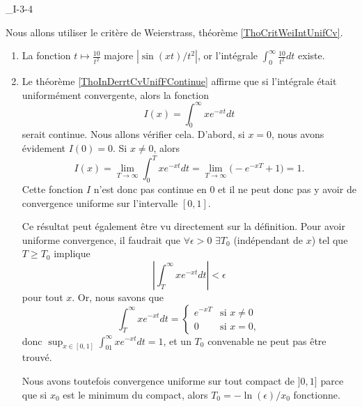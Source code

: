 

\begin{corrige}{_I-3-4}

Nous allons utiliser le critère de Weierstrass, théorème \ref{ThoCritWeiIntUnifCv}.

\begin{enumerate}
\item
	 La fonction $t\mapsto\frac{ 10 }{ t^2 }$ majore $| \sin(xt)/t^2 |$, or l'intégrale $\int_0^{\infty}\frac{ 10 }{ t^2 } dt$ existe.
\item 

	Le théorème \ref{ThoInDerrtCvUnifFContinue} affirme que si l'intégrale était uniformément convergente, alors la fonction
	\begin{equation}
		I(x)=\int_0^{\infty}x e^{-xt}dt
	\end{equation}
	serait continue. Nous allons vérifier cela. D'abord, si $x=0$, nous avons évidement $I(0)=0$. Si $x\neq 0$, alors
	\begin{equation}
		I(x)=\lim_{T\to\infty}\int_0^{T}x e^{-xt}dt=\lim_{T\to\infty}\big( - e^{-xT}+1 \big)=1.
	\end{equation}
	Cette fonction $I$ n'est donc pas continue en $0$ et il ne peut donc pas y avoir de convergence uniforme sur l'intervalle $[0,1]$.

	Ce résultat peut également être vu directement sur la définition. Pour avoir uniforme convergence, il faudrait que $\forall\epsilon>0$ $\exists T_0$ (indépendant de $x$) tel que $T\geq T_0$ implique
	\begin{equation}
		\left| \int_T^{\infty} x e^{-xt}dt\right|<\epsilon
	\end{equation}
pour tout $x$. Or, nous savons que
\begin{equation}
	 \int_T^{\infty} x e^{-xt}dt=
		\begin{cases}
	 e^{-xT}	&	\text{si }x\neq 0\\
	0	&	 \text{si }x=0,
\end{cases}
\end{equation}
donc $\sup_{x\in[0,1]}\int_01^{\infty}x e^{-xt}dt=1$, et un $T_0$ convenable ne peut pas être trouvé.

	Nous avons toutefois convergence uniforme sur tout compact de $]0,1]$ parce que si $x_0$ est le minimum du compact, alors $T_0=-\ln(\epsilon)/x_{0}$ fonctionne.


\end{enumerate}
\end{corrige}
